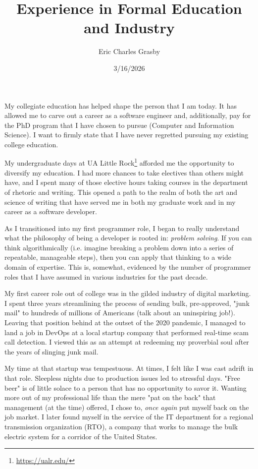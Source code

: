 \documentclass[oneside]{article}
\title{Experience in Formal Education and Industry}
\author{Eric Charles Grasby}
\date{3/16/2026}
\begin{document}
\maketitle{}
My collegiate education has helped shape the person that I am today. It has allowed me to carve out a career as a software engineer and, additionally, pay for the PhD program that I have chosen to pursue (Computer and Information Science). I want to firmly state that I have never regretted pursuing my existing college education. 

My undergraduate days at UA Little Rock\footnote{\url{https://ualr.edu/}} afforded me the opportunity to diversify my education. I had more chances to take electives than others might have, and I spent many of those elective hours taking courses in the department of rhetoric and writing. This opened a path to the realm of both the art and science of writing that have served me in both my graduate work and in my career as a software developer.

As I transitioned into my first programmer role, I began to really understand what the philosophy of being a developer is rooted in: \textit{problem solving}. If you can think algorithmically (i.e. imagine breaking a problem down into a series of repeatable, manageable steps), then you can apply that thinking to a wide domain of expertise. This is, somewhat, evidenced by the number of programmer roles that I have assumed in various industries for the past decade.

My first career role out of college was in the gilded industry of digital marketing. I spent three years streamlining the process of sending bulk, pre-approved, "junk mail" to hundreds of millions of Americans (talk about an uninspiring job!). Leaving that position behind at the outset of the 2020 pandemic, I managed to land a job in DevOps at a local startup company that performed real-time scam call detection. I viewed this as an attempt at redeeming my proverbial soul after the years of slinging junk mail. 

My time at that startup was tempestuous. At times, I felt like I was cast adrift in that role. Sleepless nights due to production issues led to stressful days. "Free beer" is of little solace to a person that has no opportunity to savor it. Wanting more out of my professional life than the mere "pat on the back" that management (at the time) offered, I chose to, \textit{once again} put myself back on the job market. I later found myself in the service of the IT department for a regional transmission organization (RTO), a company that works to manage the bulk electric system for a corridor of the United States.
\end{document}
